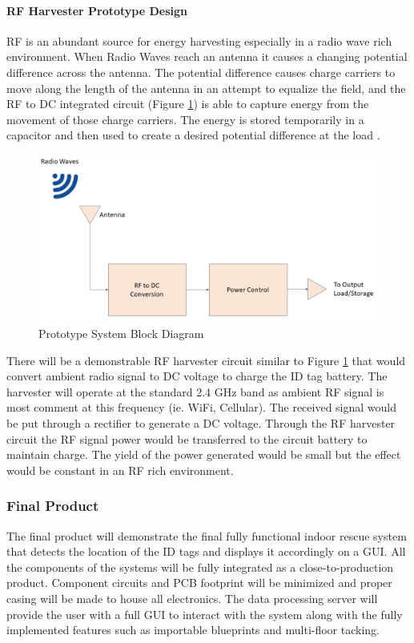 \break
\paragraph{RF Harvester Prototype Design}
RF is an abundant source for energy harvesting especially in a radio wave rich environment. When Radio Waves reach an antenna it causes a changing potential difference across the antenna. The potential difference causes charge carriers to move along the length of the antenna in an attempt to equalize the field, and the RF to \Gls{DC} integrated circuit (Figure \ref{fig:rfh}) is able to capture energy from the movement of those charge carriers. The energy is stored temporarily in a capacitor and then used to create a desired potential difference at the load \cite{R5}.
\begin{figure}[h!]
    \centering
    \includegraphics[width=\linewidth]{./images/rf_harvest.png}
    \caption{Prototype System Block Diagram}
    \label{fig:rfh}
\end{figure}

\bigskip
There will be a demonstrable RF harvester circuit similar to Figure \ref{fig:rfh} that would convert ambient radio signal to DC voltage to charge the ID tag battery. The harvester will operate at the standard 2.4 GHz band as ambient RF signal is most comment at this frequency (ie. WiFi, Cellular). The received signal would be put through a rectifier to generate a DC voltage. Through the RF harvester circuit the RF signal power would be transferred to the circuit battery to maintain charge. The yield of the power generated would be small but the effect would be constant in an RF rich environment.

\break
\subsubsection{Final Product}
The final product will demonstrate the final fully functional indoor rescue system that detects the location of the ID tags and displays it accordingly on a GUI. All the components of the systems will be fully integrated as a close-to-production product. Component circuits and \Gls{PCB} footprint will be minimized and proper casing will be made to house all electronics. The data processing server will provide the user with a full GUI to interact with the system along with the fully implemented features such as importable blueprints and multi-floor tacking.

